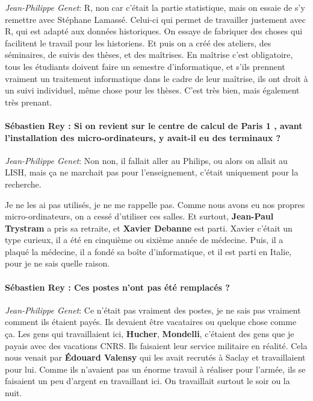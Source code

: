 \noindent\emph{Jean-Philippe Genet}: R, non car c'était la partie statistique, mais on essaie de s'y remettre avec Stéphane Lamassé. Celui-ci  qui permet de travailler justement avec R, qui est adapté aux données historiques. On essaye de fabriquer des choses qui facilitent le travail pour les historiens. Et puis on a créé des ateliers, des séminaires, de suivis des thèses, et des maîtrises. En maîtrise c'est obligatoire, tous les étudiants doivent faire un semestre d'informatique, et s'ils prennent vraiment un traitement informatique dans le cadre de leur maîtrise, ils ont droit à un suivi individuel, même chose pour les thèses. C'est très bien, mais également très prenant.

\paragraph*{Sébastien Rey : Si on revient sur le centre de calcul de Paris 1 , avant l'installation des micro-ordinateurs, y avait-il eu des terminaux ? }

\noindent\emph{Jean-Philippe Genet}: Non non, il fallait aller au Philips, ou alors on allait au LISH, mais ça ne marchait pas pour l'enseignement, c'était uniquement pour la recherche. 

Je ne les ai pas utilisés, je ne me rappelle pas. Comme nous avons eu nos propres micro-ordinateurs, on a cessé d'utiliser ces salles. Et surtout, \textbf{Jean-Paul Trystram} a pris sa retraite, et \textbf{Xavier Debanne} est parti. Xavier c'était un type curieux, il a été en cinquième ou sixième année de médecine. Puis, il a plaqué la médecine, il a fondé sa boîte d'informatique, et il est parti en Italie, pour je ne sais quelle raison.

\paragraph*{Sébastien Rey : Ces postes n'ont pas été remplacés ?}

\noindent\emph{Jean-Philippe Genet}: Ce n'était pas vraiment des postes, je ne sais pas vraiment comment ils étaient payés. Ils devaient être vacataires ou quelque chose comme ça. Les gens qui travaillaient ici, \textbf{Hucher}, \textbf{Mondelli}, c'étaient des gens que je payais avec des vacations CNRS. Ils faisaient leur service militaire en réalité. Cela nous venait par \textbf{Édouard Valensy} qui les avait recrutés à Saclay et travaillaient pour lui. Comme ils n'avaient pas un énorme travail à réaliser pour l'armée, ils se faisaient un peu d'argent en travaillant ici. On travaillait surtout le soir ou la nuit. 


